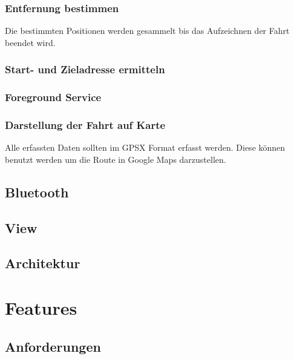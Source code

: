 \documentclass[a4paper]{article}
\begin{document}
\subsubsection{Entfernung bestimmen}
Die bestimmten Positionen werden gesammelt bis das Aufzeichnen der Fahrt beendet wird.

\subsubsection{Start- und Zieladresse ermitteln}

\subsubsection{Foreground Service}

\subsubsection{Darstellung der Fahrt auf Karte}
Alle erfassten Daten sollten im GPSX Format erfasst werden. 
Diese können benutzt werden um die Route in Google Maps darzustellen.

\subsection{Bluetooth}

\subsection{View}

\subsection{Architektur}

\section{Features}

\subsection{Anforderungen}
\end{document}
